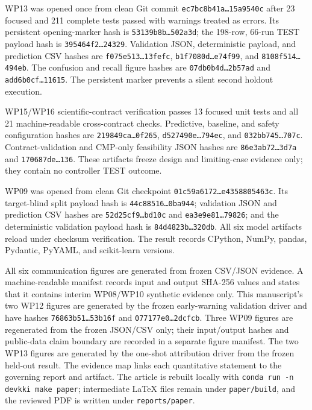 \documentclass[10pt,twocolumn]{article}
\begin{document}
WP13 was opened once from clean Git commit
\texttt{ec7bc8b41a\ldots 15a9540c} after 23 focused and 211 complete tests
passed with warnings treated as errors. Its persistent opening-marker hash is
\texttt{53139b8b\ldots 502a3d}; the 198-row, 66-run TEST payload hash is
\texttt{395464f2\ldots 24329}. Validation JSON, deterministic payload, and
prediction CSV hashes are \texttt{f075e513\ldots 13fefc},
\texttt{b1f7080d\ldots e74f99}, and
\texttt{8108f514\ldots 494eb}. The confusion and recall figure hashes are
\texttt{07db0b4d\ldots 2b57ad} and
\texttt{add6b0cf\ldots 11615}. The persistent marker prevents a silent second
holdout execution.

WP15/WP16 scientific-contract verification passes 13 focused unit tests and
all 21 machine-readable cross-contract checks. Predictive, baseline, and
safety configuration hashes are \texttt{219849ca\ldots 0f265},
\texttt{d527490e\ldots 794ec}, and
\texttt{032bb745\ldots 707c}. Contract-validation and CMP-only feasibility
JSON hashes are \texttt{86e3ab72\ldots 3d7a} and
\texttt{170687de\ldots 136}. These artifacts freeze design and limiting-case
evidence only; they contain no controller TEST outcome.

WP09 was opened from clean Git checkpoint
\texttt{01c59a6172\ldots e4358805463c}. Its target-blind split payload hash is
\texttt{44c88516\ldots 0ba944}; validation JSON and prediction CSV hashes are
\texttt{52d25cf9\ldots bd10c} and
\texttt{ea3e9e81\ldots 79826}; and the deterministic validation payload hash is
\texttt{84d4823b\ldots 320db}. All six model artifacts reload under checksum
verification. The result records CPython, NumPy, pandas, Pydantic, PyYAML, and
scikit-learn versions.

All six communication figures are generated from frozen CSV/JSON evidence. A
machine-readable manifest records input and output SHA-256 values and states
that it contains interim WP08/WP10 synthetic evidence only. This manuscript's
two WP12 figures are generated by the frozen early-warning validation driver
and have hashes \texttt{76863b51\ldots 53b16f} and
\texttt{077177e0\ldots 2dcfcb}. Three WP09 figures are regenerated from the
frozen JSON/CSV only; their input/output hashes and public-data claim boundary
are recorded in a separate figure manifest. The two WP13 figures are generated
by the one-shot attribution driver from the frozen held-out result. The
evidence map links each quantitative statement to the governing report and
artifact. The article is rebuilt locally with
\texttt{conda run -n devkki make paper}; intermediate LaTeX files remain under
\texttt{paper/build}, and the reviewed PDF is written under
\texttt{reports/paper}.
\end{document}
